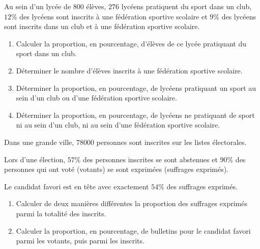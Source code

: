 \documentclass[a4paper]{article}
\begin{document}
  \medskip
  
  \begin{exerciceinterro}{}{}
  Au sein d'un lycée de $800$ élèves, $276$ lycéens pratiquent du sport dans un club, $12\%$ des lycéens sont inscrits à 
  une fédération sportive scolaire et $9\%$ des lycéens sont inscrits dans un club et à une fédération sportive scolaire.
  \begin{enumerate}
    \item Calculer la proportion, en pourcentage, d'élèves de ce lycée pratiquant du sport dans un club.
    \item Déterminer le nombre d'élèves inscrits à une fédération sportive scolaire.
    \item Déterminer la proportion, en pourcentage, de lycéens pratiquant un sport au sein d'un club ou d'une fédération sportive scolaire.
    \item Déterminer la proportion, en pourcentage, de lycéens ne pratiquant de sport ni au sein d'un club, ni au sein d'une fédération sportive scolaire.
  \end{enumerate}
  \end{exerciceinterro}
  
  
  \medskip
  
  \begin{exerciceinterro}{}{}
    Dans une grande ville, $78000$ personnes sont inscrites sur les listes électorales.
  
    Lors d'une élection, $57\%$ des personnes inscrites se sont abstenues et $90\%$ des personnes 
    qui ont voté (votants) se sont exprimées (suffrages exprimés).
    
    Le candidat favori est en tête avec exactement $54\%$ des suffrages exprimés.
    \begin{enumerate}
      \item Calculer de deux manières différentes la proportion des suffrages exprimés parmi la totalité des inscrits.
      \item Calculer la proportion, en pourcentage, de bulletins pour le candidat favori parmi les votants, puis parmi les inscrits.
    \end{enumerate}
  \end{exerciceinterro}
  
\end{document}
